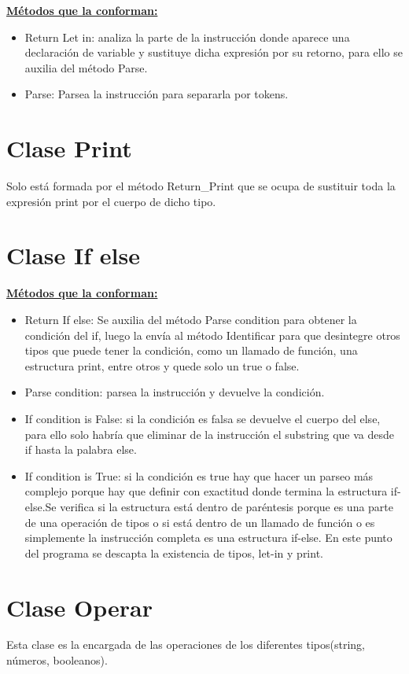 \documentclass[12pt, letterpaper]{article}
\begin{document}
\textbf{\underline{Métodos que la conforman: }} 
\begin{itemize}
    \item Return Let in: analiza la parte de la instrucción donde aparece una declaración de variable y sustituye dicha expresión por su retorno, para ello se auxilia del método Parse.
    \item Parse: Parsea la instrucción para separarla por tokens.
\end{itemize}
\newpage

\section{Clase Print}
Solo está formada por el método Return\_Print que se ocupa de sustituir toda la expresión print por el cuerpo de dicho tipo.
\newpage

\section{Clase If else}

\textbf{\underline{Métodos que la conforman: }} 
\begin{itemize}
    \item Return If else: Se auxilia del método Parse condition para obtener la condición del if, luego la envía al método Identificar para que desintegre otros tipos que puede tener la condición, como un llamado de función, una estructura print, entre otros y quede solo un true o false.
    \item Parse condition: parsea la instrucción y devuelve la condición.
    \item If condition is False: si la condición es falsa se devuelve el cuerpo del else, para ello solo habría que eliminar de la instrucción el substring que va desde if hasta la palabra else.  
    \item If condition is True: si la condición es true hay que hacer un parseo más complejo porque hay que definir con exactitud donde termina la estructura if-else.Se verifica si la estructura está dentro de paréntesis porque es una parte de una operación de tipos o si está dentro de un llamado de función o es simplemente la instrucción completa es una estructura if-else. En este punto del programa se descapta la existencia de tipos, let-in y print.
\end{itemize}
\newpage

\section{Clase Operar}
Esta clase es la encargada de las operaciones de los diferentes tipos(string, números, booleanos). \\
\end{document}
